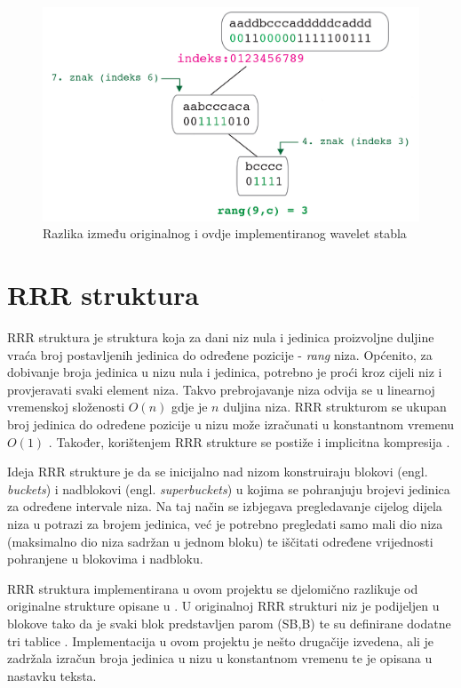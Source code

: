 \begin{figure}[H]
\centering
\includegraphics[width=\linewidth]{./pictures/Waveletquery.jpg}
\caption{Razlika između originalnog i ovdje implementiranog wavelet stabla}\label{query}
\end{figure}


\section{RRR struktura}
RRR struktura je struktura koja za dani niz nula i jedinica proizvoljne duljine vraća broj postavljenih jedinica do određene pozicije - \emph{rang} niza. Općenito, za dobivanje broja jedinica u nizu nula i jedinica, potrebno je proći kroz cijeli niz i provjeravati svaki element niza. Takvo prebrojavanje niza odvija se u linearnoj vremenskoj složenosti $O(n)$ gdje je $n$ duljina niza. RRR strukturom se ukupan broj jedinica do određene pozicije u nizu može izračunati u konstantnom vremenu $O(1)$ \cite{rrr1}. Također, korištenjem RRR strukture se postiže i implicitna kompresija \cite{alexRRR}. 

Ideja RRR strukture je da se inicijalno nad nizom konstruiraju blokovi (engl. \textit{buckets}) i nadblokovi (engl. \textit{superbuckets}) u kojima se pohranjuju brojevi jedinica za određene intervale niza. Na taj način se izbjegava pregledavanje cijelog dijela niza u potrazi za brojem jedinica, već je potrebno pregledati samo mali dio niza (maksimalno dio niza sadržan u jednom bloku) te iščitati određene vrijednosti pohranjene u blokovima i nadbloku. 

RRR struktura implementirana u ovom projektu se djelomično razlikuje od originalne strukture opisane u \cite{rrr1}. U originalnoj RRR strukturi niz je podijeljen u blokove tako da je svaki blok predstavljen parom (SB,B) te su definirane dodatne tri tablice \cite{rrr2}. Implementacija u ovom projektu je nešto drugačije izvedena, ali je zadržala izračun broja jedinica u nizu u konstantnom vremenu te je opisana u nastavku teksta.

